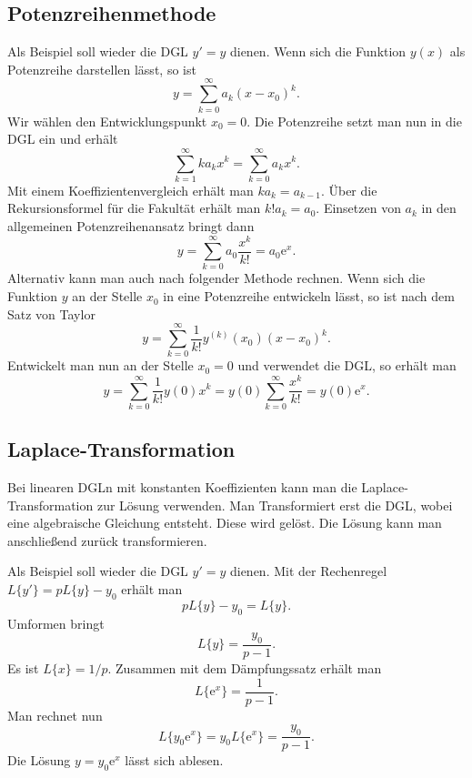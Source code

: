 \documentclass[a4paper,10pt,fleqn,twocolumn,twoside,openany]{article}
\numberwithin{equation}{section}
\newcommand{\ee}{\mathrm e}
\theoremstyle{definition}
\begin{document}
\subsection{Potenzreihenmethode}

Als Beispiel soll wieder die DGL $y'=y$ dienen.
Wenn sich die Funktion $y(x)$ als Potenzreihe darstellen lässt, so ist
\begin{equation}
y=\sum_{k=0}^\infty a_k(x-x_0)^k.
\end{equation}
Wir wählen den Entwicklungspunkt $x_0=0$. Die Potenzreihe setzt man
nun in die DGL ein und erhält
\begin{equation}
\sum_{k=1}^\infty ka_kx^k = \sum_{k=0}^\infty a_kx^k.
\end{equation}
Mit einem Koeffizientenvergleich erhält man $ka_k=a_{k-1}$.
Über die Rekursionsformel für die Fakultät erhält man $k!a_k=a_0$.
Einsetzen von $a_k$ in den allgemeinen Potenzreihenansatz bringt dann
\begin{equation}
y=\sum_{k=0}^\infty a_0\frac{x^k}{k!} = a_0\ee^x.
\end{equation}
Alternativ kann man auch nach folgender Methode rechnen.
Wenn sich die Funktion $y$ an der Stelle $x_0$ in eine Potenzreihe
entwickeln lässt, so ist nach dem Satz von Taylor
\begin{equation}
y = \sum_{k=0}^\infty \frac{1}{k!}y^{(k)}(x_0)(x-x_0)^k.
\end{equation}
Entwickelt man nun an der Stelle $x_0=0$ und verwendet die DGL,
so erhält man
\begin{equation}
y = \sum_{k=0}^\infty \frac{1}{k!}y(0)x^k
= y(0)\sum_{k=0}^\infty \frac{x^k}{k!}
= y(0)\ee^x.
\end{equation}

\subsection{Laplace-Transformation}

Bei linearen DGLn mit konstanten Koeffizienten kann man die
Laplace-Transformation zur Lösung verwenden. Man Transformiert
erst die DGL, wobei eine algebraische Gleichung entsteht. Diese
wird gelöst. Die Lösung kann man anschließend zurück transformieren.

Als Beispiel soll wieder die DGL $y'=y$ dienen. Mit der Rechenregel
$L\{y'\} = pL\{y\}-y_0$ erhält man
\begin{equation}
pL\{y\}-y_0 = L\{y\}.
\end{equation}
Umformen bringt
\begin{equation}
L\{y\} = \frac{y_0}{p-1}.
\end{equation}
Es ist $L\{x\} = 1/p$. Zusammen mit dem Dämpfungssatz erhält man
\begin{equation}
L\{\ee^x\} = \frac{1}{p-1}.
\end{equation}
Man rechnet nun
\begin{equation}
L\{y_0\ee^x\} = y_0L\{\ee^x\} = \frac{y_0}{p-1}.
\end{equation}
Die Lösung $y=y_0\ee^x$ lässt sich ablesen.
\end{document}
